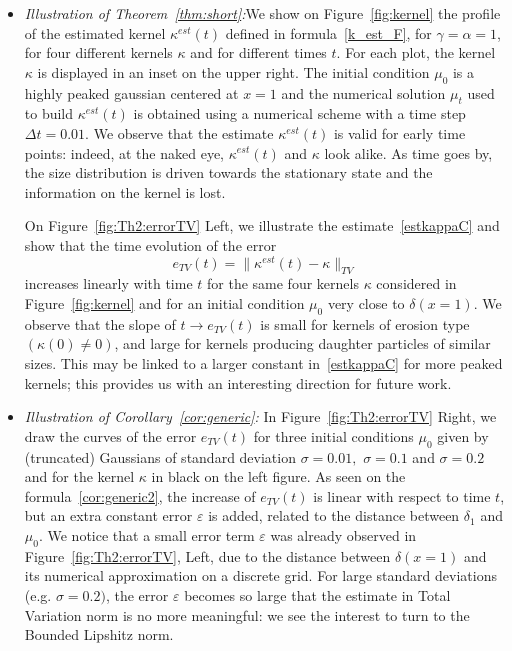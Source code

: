 \documentclass[10pt]{amsart}
\theoremstyle{definition}\newtheorem{defi}[theo]{Definition}\newtheorem{rema}[theo]{Remark}\newtheorem{exam}[theo]{Example}\newtheorem{exem}[theo]{Example}\newtheorem{nota}[theo]{Notation}
\newcommand*\eps{\varepsilon}
\begin{document}
\begin{itemize}
\item \emph{Illustration of Theorem~\ref{thm:short}:\;}We show on Figure~\ref{fig:kernel} the profile of the estimated kernel $\kappa^{est}(t)$ defined in formula~\eqref{k_est_F}, for $\gamma=\alpha=1$, for four different kernels $\kappa$ and for different times $t$. For each plot, the kernel $\kappa$ is displayed in an inset on the upper right. The initial condition $\mu_0$ is a highly peaked gaussian centered at $x=1$ and the numerical solution $\mu_t$ used to build $\kappa^{est}(t)$ is obtained using a numerical scheme with a time step $\Delta t=0.01$. We observe that the estimate $\kappa^{est}(t)$ is valid for early time points: indeed, at the naked eye, $\kappa^{est}(t)$ and $\kappa$ look alike. As time goes by, the size distribution is driven towards the stationary state and the information on the kernel is lost. 

\noindent On Figure~\ref{fig:Th2:errorTV} Left, we illustrate the estimate~\eqref{estkappaC} and show that the time evolution of the error
\[
e_{TV}(t)=\Big\|\kappa^{est}(t)-\kappa\Big\|_{TV}
\]
increases linearly with time $t$ for the same four kernels $\kappa$ considered in Figure~\ref{fig:kernel} and for an initial condition $\mu_0$ very close to $\delta(x=1)$.
We observe that the slope of $t\to e_{TV}(t)$ is small for kernels of erosion type $(\kappa(0)\neq 0)$, and large for kernels producing daughter particles of similar sizes. This may be linked to a larger constant in~\eqref{estkappaC} for more peaked kernels; this provides us with an interesting direction for future work.

\vspace*{4pt}
\item \emph{Illustration of Corollary~\ref{cor:generic}:\;} In Figure~\ref{fig:Th2:errorTV} Right, we draw the curves of the error $e_{TV}(t)$ for three initial conditions $\mu_0$ given by (truncated) Gaussians of standard deviation $\sigma=0.01,$ $\sigma=0.1$ and $\sigma=0.2$ and for the kernel $\kappa$ in black on the left figure. As seen on the formula~\eqref{cor:generic2}, the increase of $e_{TV}(t)$ is linear with respect to time $t$, but an extra constant error $\eps$ is added, related to the distance between $\delta_1$ and $\mu_0$. We notice that a small error term $\eps$ was already observed in Figure~\ref{fig:Th2:errorTV}, Left, due to the distance between $\delta(x=1)$ and its numerical approximation on a discrete grid. For large standard deviations (e.g. $\sigma=0.2)$, the error $\eps$ becomes so large that the estimate in Total Variation norm is no more meaningful: we see the interest to turn to the Bounded Lipshitz norm.



\end{itemize}
\end{document}
